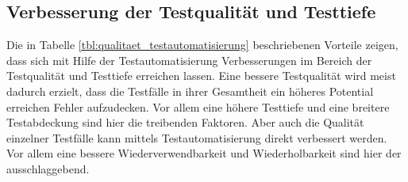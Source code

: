 \subsection{Verbesserung der Testqualität und Testtiefe}
\label{sec:verbesserung_der_testqualität_und_testtiefe}
Die in Tabelle \ref{tbl:qualitaet_testautomatisierung} beschriebenen Vorteile zeigen, dass sich mit Hilfe der Testautomatisierung Verbesserungen im Bereich der Testqualität und Testtiefe erreichen lassen. Eine bessere Testqualität wird meist dadurch erzielt, dass die Testfälle in ihrer Gesamtheit ein höheres Potential erreichen Fehler aufzudecken. Vor allem eine höhere Testtiefe und eine breitere Testabdeckung sind hier die treibenden Faktoren. Aber auch die Qualität einzelner Testfälle kann mittels Testautomatisierung direkt verbessert werden. Vor allem eine bessere Wiederverwendbarkeit und Wiederholbarkeit sind hier der ausschlaggebend.

